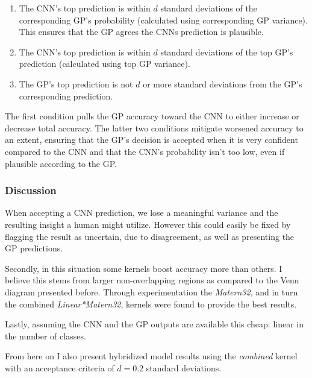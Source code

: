 \documentclass{article}
\begin{document}
\begin{enumerate}
\item The CNN's top prediction is within $d$ standard deviations of the corresponding GP's probability (calculated using corresponding GP variance). This ensures that the GP agrees the CNNs prediction is plausible. 
\item The CNN's top prediction is within $d$ standard deviations of the top GP's prediction (calculated using top GP variance).
\item The GP's top prediction is not $d$ or more standard deviations from the GP's corresponding prediction.
\end{enumerate}

The first condition pulls the GP accuracy toward the CNN to either increase or decrease total accuracy. The latter two conditions mitigate worsened accuracy to an extent, ensuring that the GP's decision is accepted when it is very confident compared to the CNN and that the CNN's probability isn't too low, even if plausible according to the GP. 

\subsubsection{Discussion}
When accepting a CNN prediction, we lose a meaningful variance and the resulting insight a human might utilize. However this could easily be fixed by flagging the result as uncertain, due to disagreement, as well as presenting the GP predictions. 

Secondly, in this situation some kernels boost accuracy more than others. I believe this stems from larger non-overlapping regions as compared to the Venn diagram presented before. Through experimentation the \textit{Matern32}, and in turn the combined \textit{Linear*Matern32}, kernels were found to provide the best results. 

Lastly, assuming the CNN and the GP outputs are available this cheap: linear in the number of classes.

From here on I also present hybridized model results using the \textit{combined} kernel with an acceptance criteria of $d=0.2$ standard deviations. 
\end{document}
